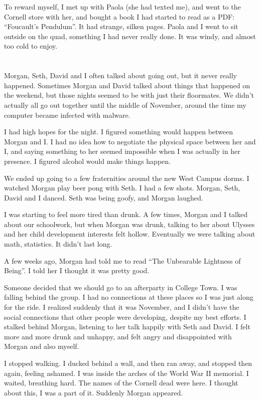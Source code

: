 To reward myself, I met up with Paola (she had texted me), and  went to the
Cornell store with her, and bought a book I had started to read as a PDF:
``Foucault's Pendulum''.  It had strange, silken pages.  Paola and I went to sit
outside on the quad, something I had never really done.  It was windy, and
almost too cold to enjoy.

\section{}

Morgan, Seth, David and I often talked about going out, but it never really
happened.  Sometimes Morgan and David talked about things that happened on the
weekend, but those nights seemed to be with just their floormates.  We didn't
actually all go out together until the middle of November, around the time my
computer became infected with malware.

I had high hopes for the night.  I figured something would happen between Morgan
and I.  I had no idea how to negotiate the physical space between her and I, and
saying something to her seemed impossible when I was actually in her presence.
I figured alcohol would make things happen.

We ended up going to a few fraternities around the new West Campus dorms.  I
watched Morgan play beer pong with Seth.  I had a few shots.  Morgan, Seth,
David and I danced.  Seth was being goofy, and Morgan laughed.  

I was starting to feel more tired than drunk.  A few times, Morgan and I talked
about our schoolwork, but when Morgan was drunk, talking to her about Ulysses
and her child development interests felt hollow.  Eventually we were talking
about math, statistics.  It didn't last long. 

A few weeks ago, Morgan had told me to read ``The Unbearable Lightness of
Being''.  I told her I thought it was pretty good.

Someone decided that we should go to an afterparty in College Town.  I was
falling behind the group.  I had no connections at these places so I was just
along for the ride.  I realized suddenly that it was November, and I didn't have
the social connections that other people were developing, despite my best
efforts.  I stalked behind Morgan, listening to her talk happily with Seth and
David.  I felt more and more drunk and unhappy, and felt angry and disappointed
with Morgan and also myself.

I stopped walking.  I ducked behind a wall, and then ran away, and stopped then
again, feeling ashamed.   I was inside the arches of the World War II memorial.
I waited, breathing hard.  The names of the Cornell dead were here.  I thought
about this, I was a part of it.  Suddenly Morgan appeared.  

